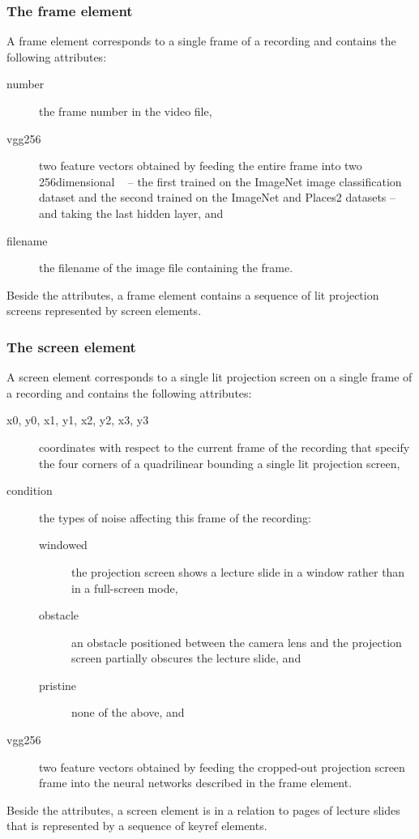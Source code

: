 \subsubsection*{The frame element}
A frame element corresponds to a single frame of a recording and contains the
following attributes:
\begin{description}
  \item[number] the frame number in the video file,
  \item[vgg256] two feature vectors obtained by feeding the entire
    frame into two 256dimensional ~\cite{simonyan2014very} -- the first trained on the ImageNet%
     image classification dataset and the
    second trained on the ImageNet and
    Places2 datasets -- and taking
    the last hidden layer, and
  \item[filename] the filename of the image file containing the frame.
\end{description}
Beside the attributes, a frame element contains a sequence of lit projection
screens represented by screen elements.

\subsubsection*{The screen element}
A screen element corresponds to a single lit projection screen on a single
frame of a recording and contains the following attributes:
\begin{description}
  \item[x0\textmd, y0\textmd, x1\textmd, y1\textmd, x2\textmd, y2\textmd,
        x3\textmd, y3] coordinates with respect to the current frame
    of the recording that specify the four corners of a quadrilinear
    bounding a single lit projection screen,
  \item[condition] the types of noise affecting this frame of the recording:
    \begin{description}
      \item[windowed] the projection screen shows a lecture slide in a window
        rather than in a full-screen mode,
      \item[obstacle] an obstacle positioned between the camera lens and the
        projection screen partially obscures the lecture slide, and
      \item[pristine] none of the above, and
    \end{description}
  \item[vgg256] two feature vectors obtained by feeding the cropped-out
    projection screen frame into the neural networks described in the frame
    element.
\end{description}
Beside the attributes, a screen element is in a relation to pages of lecture
slides that is represented by a sequence of keyref elements.

